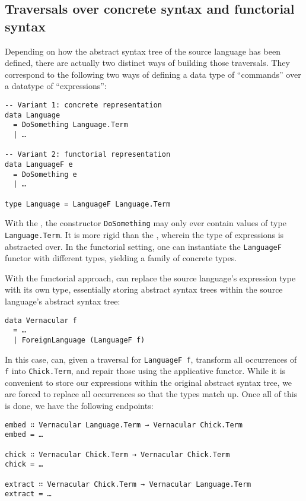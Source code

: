 \subsection{Traversals over concrete syntax and functorial syntax}

Depending on how the abstract syntax tree of the source language has been
defined, there are actually two distinct ways of building those traversals.
They correspond to the following two ways of defining a data type of
``commands'' over a datatype of ``expressions'':

\begin{verbatim}
-- Variant 1: concrete representation
data Language
  = DoSomething Language.Term
  | …

-- Variant 2: functorial representation
data LanguageF e
  = DoSomething e
  | …

type Language = LanguageF Language.Term
\end{verbatim}

With the , the constructor
\texttt{DoSomething} may only ever contain values of type
\texttt{Language.Term}.  It is more rigid than the
, wherein the type of expressions is
abstracted over.  In the functorial setting, one can instantiate the
\texttt{LanguageF} functor with different types, yielding a family
of concrete types.

With the functorial approach, \Coop{} can replace the source language's
expression type with its own type, essentially storing \Chick{} abstract syntax
trees within the source language's abstract syntax tree:

\begin{verbatim}
data Vernacular f
  = …
  | ForeignLanguage (LanguageF f)
\end{verbatim}

In this case, \Chick{} can, given a traversal for \texttt{LanguageF
f}, transform all occurrences of \texttt{f} into
\texttt{Chick.Term}, and repair those using the applicative
functor.  While it is convenient to store our expressions within the original
abstract syntax tree, we are forced to replace all occurrences so that the types
match up.  Once all of this is done, we have the following endpoints:

\begin{verbatim}
embed ∷ Vernacular Language.Term → Vernacular Chick.Term
embed = …

chick ∷ Vernacular Chick.Term → Vernacular Chick.Term
chick = …

extract ∷ Vernacular Chick.Term → Vernacular Language.Term
extract = …
\end{verbatim}

